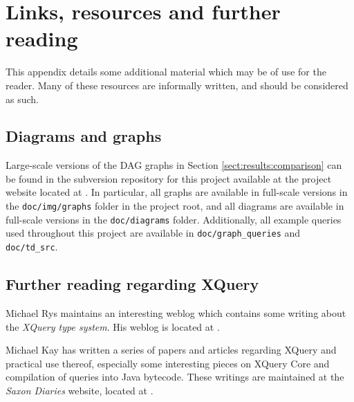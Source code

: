\chapter{Links, resources and further reading}
\label{appendix:links_and_resources}
This appendix details some additional material which may be of use for the
reader. Many of these resources are informally written, and should
be considered as such.

\section{Diagrams and graphs}
Large-scale versions of the DAG graphs in Section \ref{sect:results:comparison}
can be found in the subversion repository for this project available at the
project website located at 
.
In particular, all graphs are available in full-scale versions in the
\texttt{doc/img/graphs} folder in the project root, and all diagrams are
available in full-scale versions in the \texttt{doc/diagrams} folder.
Additionally, all example queries used throughout this project are available
in \texttt{doc/graph\_queries} and \texttt{doc/td\_src}.

\section{Further reading regarding XQuery}
Michael Rys maintains an interesting weblog which contains some writing about
the \emph{XQuery type system}. His weblog is located at
.

Michael Kay has written a series of papers and articles regarding XQuery and
practical use thereof, especially some interesting pieces on XQuery Core and
compilation of queries into Java bytecode. These writings are maintained at the
\emph{Saxon Diaries} website, located at
.


